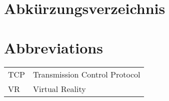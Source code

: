 \ifmmtlanguagegerman
\section*{Abkürzungsverzeichnis}
\else
\section*{Abbreviations}
\fi

\begin{table}[h]		
	\begin{tabular}{ll}
		TCP & Transmission Control Protocol \\
		VR & Virtual Reality \\			
	\end{tabular}
\end{table}
